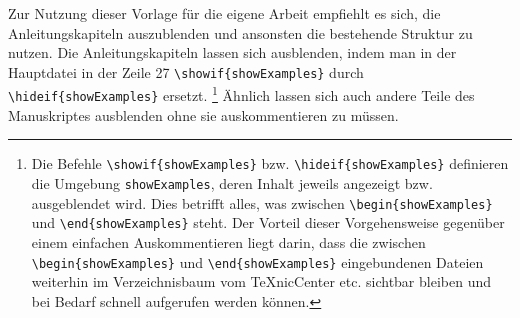 \begin{showExamples}
Zur Nutzung dieser Vorlage für die eigene Arbeit empfiehlt es sich, die Anleitungskapiteln auszublenden und ansonsten die bestehende Struktur zu nutzen.
Die Anleitungskapiteln lassen sich ausblenden, indem man in der Hauptdatei
 in der Zeile 27
\verb+\showif{showExamples}+ durch \verb+\hideif{showExamples}+ ersetzt.%
%
\footnote{Die Befehle \verb+\showif{showExamples}+ bzw. \verb+\hideif{showExamples}+ definieren die Umgebung \texttt{showExamples},
deren Inhalt jeweils angezeigt bzw. ausgeblendet wird.
Dies betrifft alles, was zwischen \verb+\begin{showExamples}+ und \verb+\end{showExamples}+ steht.
Der Vorteil dieser Vorgehensweise gegenüber einem einfachen Auskommentieren liegt darin,
dass die zwischen \verb+\begin{showExamples}+ und \verb+\end{showExamples}+ eingebundenen Dateien
weiterhin im Verzeichnisbaum vom TeXnicCenter etc. sichtbar bleiben und bei Bedarf schnell aufgerufen werden können.}
%
Ähnlich lassen sich auch andere Teile des Manuskriptes ausblenden ohne sie auskommentieren zu müssen.
%














%
%
%
%
%
%
%
%
%
\end{showExamples}%